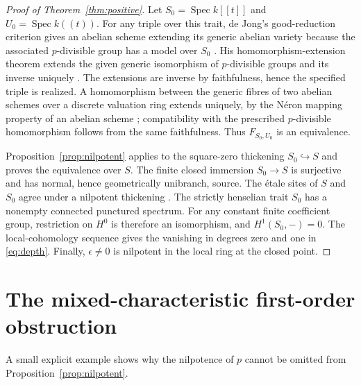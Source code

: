 \documentclass[11pt]{article}
\theoremstyle{remark}\newtheorem{remark}[theorem]{Remark}
\newcommand{\Spec}{\operatorname{Spec}}
\begin{document}
\begin{proof}[Proof of Theorem~\ref{thm:positive}]
Let $S_0=\Spec k[[t]]$ and $U_0=\Spec k((t))$. For any triple over this trait, de Jong's good-reduction criterion gives an abelian scheme extending its generic abelian variety because the associated $p$-divisible group has a model over $S_0$ \citep[Theorem~3, p.~261]{DeJongICM}. His homomorphism-extension theorem extends the given generic isomorphism of $p$-divisible groups and its inverse uniquely \citep[Theorem~2, p.~261]{DeJongICM}. The extensions are inverse by faithfulness, hence the specified triple is realized. A homomorphism between the generic fibres of two abelian schemes over a discrete valuation ring extends uniquely, by the N\'eron mapping property of an abelian scheme \citep[Proposition~4.13 and Remark~4.14, author manuscript p.~13]{LiuTong}; compatibility with the prescribed $p$-divisible homomorphism follows from the same faithfulness. Thus $F_{S_0,U_0}$ is an equivalence.

Proposition~\ref{prop:nilpotent} applies to the square-zero thickening $S_0\hookrightarrow S$ and proves the equivalence over $S$. The finite closed immersion $S_0\to S$ is surjective and has normal, hence geometrically unibranch, source. The \'etale sites of $S$ and $S_0$ agree under a nilpotent thickening \citep[Tag~04DY]{Stacks}. The strictly henselian trait $S_0$ has a nonempty connected punctured spectrum. For any constant finite coefficient group, restriction on $H^0$ is therefore an isomorphism, and $H^1(S_0,-)=0$. The local-cohomology sequence gives the vanishing in degrees zero and one in \eqref{eq:depth}. Finally, $\epsilon\ne0$ is nilpotent in the local ring at the closed point.
\end{proof}

\section{The mixed-characteristic first-order obstruction}

A small explicit example shows why the nilpotence of $p$ cannot be omitted from Proposition~\ref{prop:nilpotent}.
\end{document}
